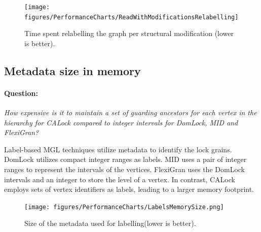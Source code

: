 \begin{figure}[ht]
	\captionsetup{justification=centering}
	\centering
		\texttt{[image: figures/PerformanceCharts/ReadWithModificationsRelabelling]}
	\caption{Time spent relabelling the graph per structural modification (lower is better).}
	\label{relabellingTime}
\end{figure}


\subsection{Metadata size in memory} \label{benchmark:metadatasize}

\paragraph{Question:} \emph{How expensive is it to maintain a set of guarding ancestors for each vertex in the hierarchy for CALock compared to integer intervals for DomLock, MID and FlexiGran?}

Label-based MGL techniques utilize metadata to identify the lock grains.
DomLock utilizes compact integer ranges as labels. 
MID uses a pair of integer ranges to represent the intervals of the vertices.
FlexiGran uses the DomLock intervals and an integer to store the level of a vertex.
In contrast, CALock employs sets of vertex identifiers as labels, leading to a larger memory footprint.

\begin{figure}
	\centering
	\captionsetup{justification=centering}
	\texttt{[image: figures/PerformanceCharts/LabelsMemorySize.png]}
 	\caption{Size of the metadata used for labelling(lower is better).}
	\label{metadataSize}
\end{figure}

